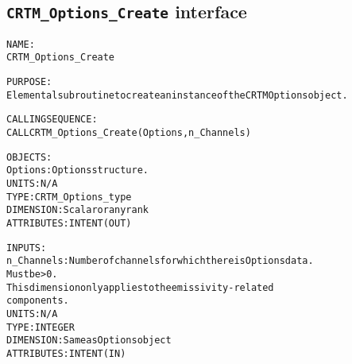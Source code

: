 \subsection{\texttt{CRTM\_Options\_Create} interface}
  \label{sec:CRTM_Options_Create_interface}
  \begin{alltt}
 
  NAME:
        CRTM_Options_Create
 
  PURPOSE:
        Elemental subroutine to create an instance of the CRTM Options object.
 
  CALLING SEQUENCE:
        CALL CRTM_Options_Create( Options, n_Channels )
 
  OBJECTS:
        Options:      Options structure.
                      UNITS:      N/A
                      TYPE:       CRTM_Options_type
                      DIMENSION:  Scalar or any rank
                      ATTRIBUTES: INTENT(OUT)
 
  INPUTS:
        n_Channels:   Number of channels for which there is Options data.
                      Must be > 0.
                      This dimension only applies to the emissivity-related
                      components.
                      UNITS:      N/A
                      TYPE:       INTEGER
                      DIMENSION:  Same as Options object
                      ATTRIBUTES: INTENT(IN)
 
  \end{alltt}
